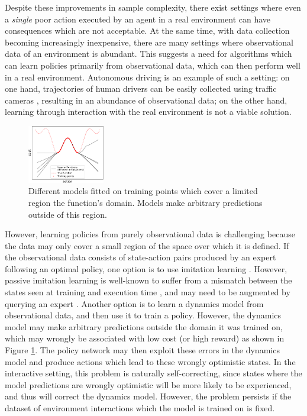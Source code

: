 \documentclass{article} %
\begin{document}
Despite these improvements in sample complexity, there exist settings where even a \textit{single} poor action executed by an agent in a real environment can have consequences which are not acceptable.
At the same time, with data collection becoming increasingly inexpensive, there are many settings where observational data of an environment is abundant.
This suggests a need for algorithms which can learn policies primarily from observational data, which can then perform well in a real environment.
Autonomous driving is an example of such a setting: on one hand, trajectories of human drivers can be easily collected using traffic cameras \citep{NGSIM}, resulting in an abundance of observational data; on the other hand, learning through interaction with the real environment is not a viable solution.


\begin{figure}
  \includegraphics[width=0.3\textwidth]{figures/driving/uncertainty_example2-crop.pdf}
  \caption{\label{simple-example}Different models fitted on training points which cover a limited region the function's domain. Models make arbitrary predictions outside of this region.}
\end{figure}
However, learning policies from purely observational data is challenging because the data may only cover a small region of the space over which it is defined.
If the observational data consists of state-action pairs produced by an expert following an optimal policy, one option is to use imitation learning \citep{Pomerleau91}.
However, passive imitation learning is well-known to suffer from a mismatch between the states seen at training and execution time \citep{Ross2010EfficientRF}, and may need to be augmented by querying an expert \citep{Dagger}.
Another option is to learn a dynamics model from observational data, and then use it to train a policy. However, the dynamics model may make arbitrary predictions outside the domain it was trained on, which may wrongly be associated with low cost (or high reward) as shown in Figure \ref{simple-example}. The policy network may then exploit these errors in the dynamics model and produce actions which lead to these wrongly optimistic states.
In the interactive setting, this problem is naturally self-correcting, since states where the model predictions are wrongly optimistic will be more likely to be experienced, and thus will correct the dynamics model. However, the problem persists if the dataset of environment interactions which the model is trained on is fixed.
\end{document}
